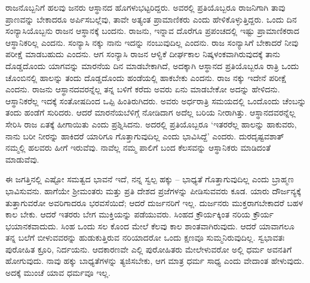 ರಾಜನೊಬ್ಬನಿಗೆ ಹಲವು ಜನರು ಆಸ್ಥಾನದ ಹೊಗಳುಭಟ್ಟರಿದ್ದರು. ಅವರಲ್ಲಿ ಪ್ರತಿಯೊಬ್ಬರೂ ರಾಜನಿಗಾಗಿ ತಾವು ಪ್ರಾಣವನ್ನು ಬೇಕಾದರೂ ಅರ್ಪಿಸಬಲ್ಲೆವು, ತಾವೇ ಅತ್ಯಂತ ಪ್ರಾಮಾಣಿಕರು ಎಂದು ಹೇಳಿಕೊಳ್ಳುತ್ತಿದ್ದರು. ಒಂದು ದಿನ ಸಂನ್ಯಾಸಿಯೊಬ್ಬನು ರಾಜನ ಆಸ್ಥಾನಕ್ಕೆ ಬಂದನು. ರಾಜನು, ಇನ್ನಾವ ದೊರೆಗೂ ಪ್ರಪಂಚದಲ್ಲಿ ಇಷ್ಟು ಪ್ರಾಮಾಣಿಕರಾದ ಆಸ್ಥಾನಿಕರಿಲ್ಲ ಎಂದನು. ಸಂನ್ಯಾಸಿ ನಕ್ಕು ನಾನು ಇದನ್ನು ನಂಬುವುದಿಲ್ಲ ಎಂದನು. ರಾಜ ಸಂನ್ಯಾಸಿಗೆ ಬೇಕಾದರೆ ನೀವು ಪರೀಕ್ಷೆ ಮಾಡಬಹುದು ಎಂದನು. ಆಗ ಸಂನ್ಯಾಸಿ ರಾಜನ ಆಳ್ವಿಕೆ ದೀರ್ಘಕಾಲ ನಿಷ್ಕಳಂಕವಾಗಿರುವುದಕ್ಕೆ ತಾನು ದೊಡ್ಡದೊಂದು ಯಾಗವನ್ನು ಮಾರನೆಯ ದಿನ ಮಾಡಬೇಕಾಗಿದೆ, ಅದಕ್ಕಾಗಿ ಆಸ್ಥಾನದ ಪ್ರತಿಯೊಬ್ಬರೂ ರಾತ್ರಿ ಒಂದು ಚೊಂಬಿನಲ್ಲಿ ಹಾಲನ್ನು ತಂದು ದೊಡ್ಡದೊಂದು ಹಂಡೆಯಲ್ಲಿ ಹಾಕಬೇಕು ಎಂದನು. ರಾಜ ನಕ್ಕು ಇದೇನೆ ಪರೀಕ್ಷೆ ಎಂದನು. ರಾಜನು ಆಸ್ಥಾನದವರನ್ನೆಲ್ಲ ತನ್ನ ಬಳಿಗೆ ಕರೆದು ಅವರು ಏನು ಮಾಡಬೇಕೋ ಅದನ್ನು ಹೇಳಿದನು. ಆಸ್ಥಾನಿಕರೆಲ್ಲ ಇದಕ್ಕೆ ಸಂತೋಷದಿಂದ ಒಪ್ಪಿ ಹಿಂತಿರುಗಿದರು. ಅವರು ಅರ್ಧರಾತ್ರಿ ಸಮಯದಲ್ಲಿ ಒಂದೊಂದು ಚೆಂಬನ್ನು ತಂದು ಹಂಡೆಗೆ ಸುರಿದರು. ಆದರೆ ಮಾರನೆಯಬೆಳಿಗ್ಗೆ ನೋಡಿದಾಗ ಅದೆಲ್ಲ ಬರಿಯ ನೀರಾಗಿತ್ತು. ಆಸ್ಥಾನದವರನ್ನೆಲ್ಲ ಸೇರಿಸಿ ರಾಜ ಏತಕ್ಕೆ ಹೀಗಾಯಿತು ಎಂದು ಪ್ರಶ್ನಿಸಿದನು. ಅದರಲ್ಲಿ ಪ್ರತಿಯೊಬ್ಬರೂ `ಇತರರೆಲ್ಲ ಹಾಲನ್ನು ಹಾಕುವರು, ನಾನು ಬರೀ ನೀರನ್ನು ಹಾಕಿದರೆ ಯಾರಿಗೂ ಗೊತ್ತಾಗುವುದಿಲ್ಲ ಎಂದು ಭಾವಿಸಿದ್ದೆ' ಎಂದರು. ದುರದೃಷ್ಟವಶಾತ್ ನಮ್ಮಲ್ಲಿ ಹಲವರು ಹೀಗೆ ಇರುವೆವು. ನಾವೆಲ್ಲ ನಮ್ಮ ಪಾಲಿಗೆ ಬಂದ ಕೆಲಸವನ್ನು ಆಸ್ಥಾನಿಕರು ಮಾಡಿದಂತೆ ಮಾಡುವೆವು.

ಈ ಜಗತ್ತಿನಲ್ಲಿ ಎಷ್ಟೋ ಸಮತ್ವದ ಭಾವನೆ ಇದೆ, ನನ್ನ ಸ್ವಲ್ಪ ಹಕ್ಕು – ಭಾಧ್ಯತೆ ಗೊತ್ತಾಗುವುದಿಲ್ಲ ಎಂದು ಬ್ರಾಹ್ಮಣ ಭಾವಿಸುವನು. ಹಾಗೆಯೇ ಶ‍್ರೀಮಂತರು ಮತ್ತು ಪ್ರತಿ ದೇಶದ ಪ್ರಜೆಗಳನ್ನು ಪೀಡಿಸುವವರು ಕೂಡ. ಯಾರು ದೌರ್ಜನ್ಯಕ್ಕೆ ತುತ್ತಾಗುವರೋ ಅವರಿಗಾದರೂ ಭರವಸೆಯಿದೆ; ಆದರೆ ದುರ್ಜನರಿಗೆ ಇಲ್ಲ. ದುರ್ಜನರು ಮುಕ್ತರಾಗಬೇಕಾದರೆ ಬಹಳ ಕಾಲ ಬೇಕು. ಆದರೆ ಇತರರು ಬೇಗ ಮುಕ್ತಿಯನ್ನು ಪಡೆಯುವರು. ಸಿಂಹದ ಕ್ರೌರ್ಯಕ್ಕಿಂತ ನರಿಯ ಕ್ರೌರ್ಯ ಭಯಾನಕವಾದುದು. ಸಿಂಹ ಒಂದು ಸಲ ಕೊಂದ ಮೇಲೆ ಕೆಲವು ಕಾಲ ಶಾಂತವಾಗಿರುವುದು. ಆದರೆ ಯಾವಾಗಲೂ ತನ್ನ ಬಲೆಗೆ ಬೀಳುವವರನ್ನು ಹುಡುಕುತ್ತಿರುವ ನರಿಯಾದರೋ ಒಂದು ಕ್ಷಣವೂ ಸುಮ್ಮನಿರುವುದಿಲ್ಲ. ಸ್ವಭಾವತಃ ಪುರೋಹಿತ ಕ್ರೂರಿ, ನಿರ್ದಯನು. ಆದಕಾರಣವೇ ಎಲ್ಲಿ ಪುರೋಹಿತರು ಮೇಲೇಳುವರೋ ಅಲ್ಲಿ ಧರ್ಮ ಅವನತಿಗೆ ಹೋಗುವುದು. ನಾವು ಹಕ್ಕು ಬಾಧ್ಯತೆಗಳನ್ನು ತ್ಯಜಿಸಬೇಕು, ಆಗ ಮಾತ್ರ ಧರ್ಮ ಸಾಧ್ಯ ಎಂದು ವೇದಾಂತ ಹೇಳುವುದು. ಅದಕ್ಕೆ ಮುಂಚೆ ಯಾವ ಧರ್ಮವೂ ಇಲ್ಲ.

\newpage

